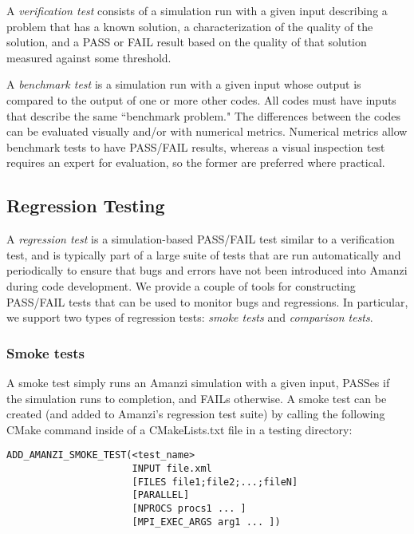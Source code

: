 A {\em verification test} consists of a simulation run with a given input describing 
a problem that has a known solution, a characterization of the quality of the 
solution, and a PASS or FAIL result based on the quality of that solution measured 
against some threshold. 


A {\em benchmark test} is a simulation run with a given input whose output is 
compared to the output of one or more other codes. All codes must have inputs that 
describe the same ``benchmark problem." The differences between the codes can be 
evaluated visually and/or with numerical metrics. Numerical metrics allow benchmark 
tests to have PASS/FAIL results, whereas a visual inspection test requires an 
expert for evaluation, so the former are preferred where practical.


\subsection{Regression Testing}

A {\em regression test} is a simulation-based PASS/FAIL test similar to a 
verification test, and is typically part of a large suite of tests that are run 
automatically and periodically to ensure that bugs and errors have not been 
introduced into Amanzi during code development. We provide a couple of tools for 
constructing PASS/FAIL tests that can be used to monitor bugs and regressions. In 
particular, we support two types of regression tests: {\em smoke tests} and 
{\em comparison tests}.

\subsubsection{Smoke tests}

A smoke test simply runs an Amanzi simulation with a given input, PASSes if 
the simulation runs to completion, and FAILs otherwise. A smoke test can be created
(and added to Amanzi's regression test suite) by calling the following CMake command 
inside of a CMakeLists.txt file in a testing directory:

\begin{verbatim}
ADD_AMANZI_SMOKE_TEST(<test_name> 
                      INPUT file.xml
                      [FILES file1;file2;...;fileN]
                      [PARALLEL] 
                      [NPROCS procs1 ... ]
                      [MPI_EXEC_ARGS arg1 ... ])
\end{verbatim}

